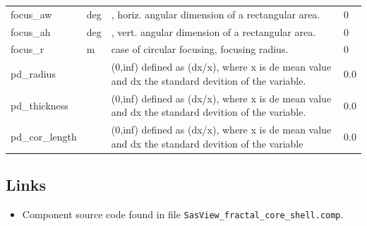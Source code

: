 \begin{longtable}{p{}p{}p{}p{}}
focus\_aw & deg & , horiz. angular dimension of a rectangular area. & 0 \\
focus\_ah & deg & , vert. angular dimension of a rectangular area. & 0 \\
focus\_r & m & case of circular focusing, focusing radius. & 0 \\
pd\_radius &  & (0,inf) defined as (dx/x), where x is de mean value and dx the standard devition of the variable. & 0.0 \\
pd\_thickness &  & (0,inf) defined as (dx/x), where x is de mean value and dx the standard devition of the variable. & 0.0 \\
pd\_cor\_length &  & (0,inf) defined as (dx/x), where x is de mean value and dx the standard devition of the variable & 0.0 \\
\bottomrule
\end{longtable}

\subsection*{Links}
\begin{itemize}
  \item Component source code found in file \texttt{SasView\_fractal\_core\_shell.comp}.
\end{itemize}
